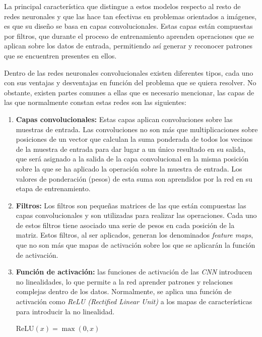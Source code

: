 La principal característica que distingue a estos modelos respecto al resto de redes neuronales y que las hace tan efectivas en problemas orientados a imágenes, es que su diseño se basa en capas convolucionales. Estas capas están compuestas por filtros, que durante el proceso de entrenamiento aprenden operaciones que se aplican sobre los datos de entrada, permitiendo así generar y reconocer patrones que se encuentren presentes en ellos.

Dentro de las redes neuronales convolucionales existen diferentes tipos, cada uno con sus ventajas y desventajas en función del problema que se quiera resolver. No obstante, existen partes comunes a ellas que es necesario mencionar, las capas de las que normalmente constan estas redes son las siguientes:

\begin{enumerate}
	\item \textbf{Capas convolucionales:} Estas capas aplican convoluciones sobre las muestras de entrada. Las convoluciones no son más que multiplicaciones sobre posiciones de un vector que calculan la suma ponderada de todos los vecinos de la muestra de entrada para dar lugar a un único resultado en su salida, que será asignado a la salida de la capa convolucional en la misma posición sobre la que se ha aplicado la operación sobre la muestra de entrada. Los valores de ponderación (pesos) de esta suma son aprendidos por la red en su etapa de entrenamiento.
	
	\item \textbf{Filtros:} Los filtros son pequeñas matrices de las que están compuestas las capas convolucionales y son utilizadas para realizar las operaciones. Cada uno de estos filtros tiene asociado una serie de pesos en cada posición de la matriz. Estos filtros, al ser aplicados, generan los denominados \textit{feature maps}, que no son más que mapas de activación sobre los que se aplicarán la función de activación.
	
	\item \textbf{Función de activación:} las funciones de activación de las \textit{CNN} introducen no linealidades, lo que permite a la red aprender patrones y relaciones complejas dentro de los datos. Normalmente, se aplica una función de activación como \textit{ReLU (Rectified Linear Unit)} a los mapas de características para introducir la no linealidad.
	
	\begin{center}
		$\text{ReLU}(x) = \max(0, x)$
	\end{center}
	

\end{enumerate}
